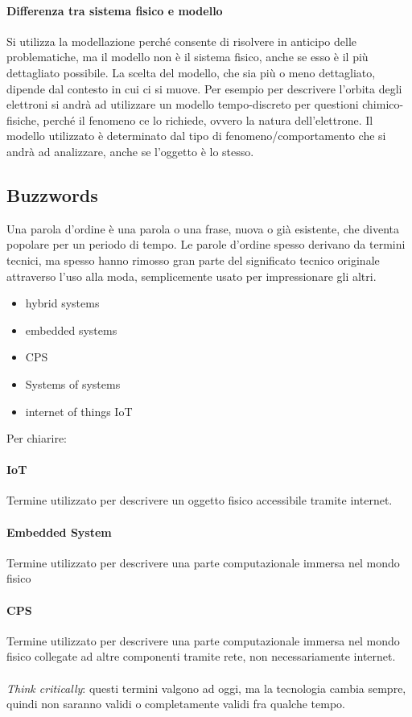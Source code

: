 \documentclass[10pt,a4paper]{article}
\begin{document}
\paragraph{Differenza tra sistema fisico e modello} Si utilizza la modellazione perché consente di risolvere in anticipo delle problematiche, ma il modello non è il sistema fisico, anche se esso è il più dettagliato possibile.
La scelta del modello, che sia più o meno dettagliato, dipende dal contesto in cui ci si muove. Per esempio per descrivere l'orbita degli elettroni si andrà ad utilizzare un modello tempo-discreto per questioni chimico-fisiche, perché il fenomeno ce lo richiede, ovvero la natura dell'elettrone.
Il modello utilizzato è determinato dal tipo di fenomeno/comportamento che si andrà ad analizzare, anche se l'oggetto è lo stesso.

\subsection{Buzzwords}
Una parola d'ordine è una parola o una frase, nuova o già esistente, che diventa popolare per un periodo di tempo. Le parole d'ordine spesso derivano da termini tecnici, ma spesso hanno rimosso gran parte del significato tecnico originale attraverso l'uso alla moda, semplicemente usato per impressionare gli altri.

\begin{itemize}
\item hybrid systems
\item embedded systems
\item CPS
\item Systems of systems
\item internet of things IoT\\
\end{itemize}
Per chiarire:
\paragraph{IoT} Termine utilizzato per descrivere un oggetto fisico accessibile tramite internet.
\paragraph{Embedded System} Termine utilizzato per descrivere una parte computazionale immersa nel mondo fisico
\paragraph{CPS} Termine utilizzato per descrivere una parte computazionale immersa nel mondo fisico collegate ad altre componenti tramite rete, non necessariamente internet.\\
\\
\textit{Think critically}: questi termini valgono ad oggi, ma la tecnologia cambia sempre, quindi non saranno validi o completamente validi fra qualche tempo.
\end{document}
